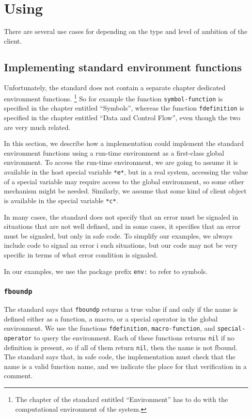 \chapter{Using \sysname{}}

There are several use cases for \sysname{} depending on the type and
level of ambition of the client.

\section{Implementing standard environment functions}

Unfortunately, the \commonlisp{} standard does not contain a separate
chapter dedicated environment functions.%
\footnote{The chapter of the standard
  entitled ``Environment'' has to do with the computational environment
  of the \commonlisp{} system.}
So for example the function \texttt{symbol-function} is specified in
the chapter entitled ``Symbols'', whereas the function
\texttt{fdefinition} is specified in the chapter entitled ``Data and
Control Flow'', even though the two are very much related.

In this section, we describe how a \commonlisp{} implementation could
implement the standard environment functions using a \sysname{}
run-time environment as a first-class global environment.  To access
the \sysname{} run-time environment, we are going to assume it is
available in the host special variable \texttt{*e*}, but in
a real system, accessing the value of a special variable may require
access to the global environment, so some other mechanism might be
needed.  Similarly, we assume that some kind of client object is
available in the special variable \texttt{*c*}.

In many cases, the \commonlisp{} standard does not specify that an
error must be signaled in situations that are not well defined, and in
some cases, it specifies that an error must be signaled, but only in
safe code.  To simplify our examples, we always include code to signal
an error i such situations, but our code may not be very specific in
terms of what error condition is signaled.

In our examples, we use the package prefix \texttt{env:} to refer to
\sysname{} symbols.

\subsection{\texttt{fboundp}}

The standard says that \texttt{fboundp} returns a true value if and
only if the name is defined either as a function, a macro, or a
special operator in the global environment.  We use the \sysname{}
functions \texttt{fdefinition}, \texttt{macro-function}, and
\texttt{special-operator} to query the environment.  Each of these
functions returns \texttt{nil} if no definition is present, so if all
of them return \texttt{nil}, then the name is not fbound.  The
standard says that, in safe code, the implementation must check that
the name is a valid function name, and we indicate the place for that
verification in a comment.

